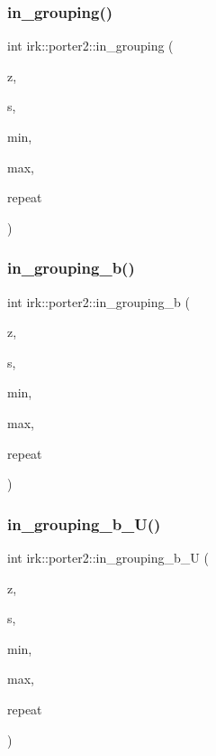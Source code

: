 \subsubsection{\texorpdfstring{in\+\_\+grouping()}{in\_grouping()}}
{\footnotesize\ttfamily int irk\+::porter2\+::in\+\_\+grouping (\begin{DoxyParamCaption}\item[{struct \mbox{\hyperlink{structirk_1_1porter2_1_1SN__env}{S\+N\+\_\+env}} $\ast$}]{z,  }\item[{const unsigned char $\ast$}]{s,  }\item[{int}]{min,  }\item[{int}]{max,  }\item[{int}]{repeat }\end{DoxyParamCaption})}

\mbox{\label{namespaceirk_1_1porter2_ad71c33734138a8364a4dcea25fe95b8d}} 
\subsubsection{\texorpdfstring{in\+\_\+grouping\+\_\+b()}{in\_grouping\_b()}}
{\footnotesize\ttfamily int irk\+::porter2\+::in\+\_\+grouping\+\_\+b (\begin{DoxyParamCaption}\item[{struct \mbox{\hyperlink{structirk_1_1porter2_1_1SN__env}{S\+N\+\_\+env}} $\ast$}]{z,  }\item[{const unsigned char $\ast$}]{s,  }\item[{int}]{min,  }\item[{int}]{max,  }\item[{int}]{repeat }\end{DoxyParamCaption})}

\mbox{\label{namespaceirk_1_1porter2_a4fb88709866ab6e5aa2618c444b14cc7}} 
\subsubsection{\texorpdfstring{in\+\_\+grouping\+\_\+b\+\_\+\+U()}{in\_grouping\_b\_U()}}
{\footnotesize\ttfamily int irk\+::porter2\+::in\+\_\+grouping\+\_\+b\+\_\+U (\begin{DoxyParamCaption}\item[{struct \mbox{\hyperlink{structirk_1_1porter2_1_1SN__env}{S\+N\+\_\+env}} $\ast$}]{z,  }\item[{const unsigned char $\ast$}]{s,  }\item[{int}]{min,  }\item[{int}]{max,  }\item[{int}]{repeat }\end{DoxyParamCaption})}

